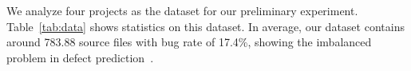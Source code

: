 We analyze four projects as the dataset for our preliminary experiment. Table~\ref{tab:data} shows statistics on this dataset. In average, our dataset contains around 783.88 source files with bug rate of 17.4\%, showing the imbalanced problem in defect prediction~\cite{wang2013using, khoshgoftaar2010attribute}.




